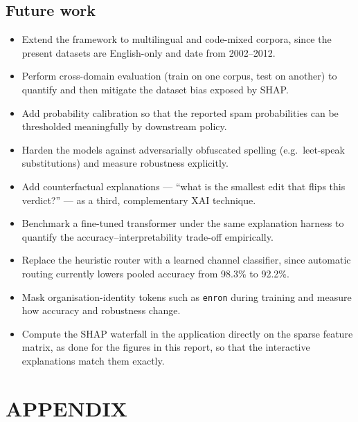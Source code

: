\documentclass[12pt,a4paper]{report}
\begin{document}
\section{Future work}

\begin{itemize}[itemsep=0pt]
  \item Extend the framework to multilingual and code-mixed corpora, since
        the present datasets are English-only and date from 2002--2012.
  \item Perform cross-domain evaluation (train on one corpus, test on
        another) to quantify and then mitigate the dataset bias exposed by
        SHAP.
  \item Add probability calibration so that the reported spam probabilities
        can be thresholded meaningfully by downstream policy.
  \item Harden the models against adversarially obfuscated spelling (e.g.\
        leet-speak substitutions) and measure robustness explicitly.
  \item Add counterfactual explanations --- ``what is the smallest edit that
        flips this verdict?'' --- as a third, complementary XAI technique.
  \item Benchmark a fine-tuned transformer under the same explanation
        harness to quantify the accuracy--interpretability trade-off
        empirically.
  \item Replace the heuristic router with a learned channel classifier,
        since automatic routing currently lowers pooled accuracy from 98.3\%
        to 92.2\%.
  \item Mask organisation-identity tokens such as \texttt{enron} during
        training and measure how accuracy and robustness change.
  \item Compute the SHAP waterfall in the application directly on the sparse
        feature matrix, as done for the figures in this report, so that the
        interactive explanations match them exactly.
\end{itemize}

\chapter*{APPENDIX}
\end{document}
